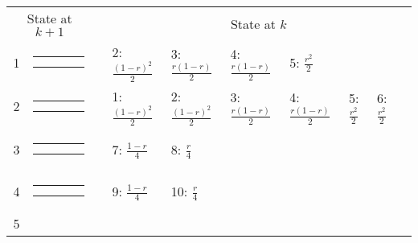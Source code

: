 \begin{center}
\begin{tabular}{ccclllllll} \hline
\multicolumn{2}{c}{State at $k+1$} & &
\multicolumn{7}{c}{State at $k$} \\
\cline{1-2} \cline{4-10}
1 &
{\renewcommand{\arraystretch}{0.3}
\renewcommand{\tabcolsep}{0.5mm}
\parbox[b][3mm][c]{12mm}{
\begin{tabular}{|p{2mm}|p{2mm}||p{2mm}|p{2mm}|} \hline
$\bullet$ & $\circ  $ &           &           \\
$\bullet$ & $\circ  $ &           &           \\ \hline
\end{tabular}}}
&
& 2: $\frac{(1-r)^2}{2}$
& 3: $\frac{r(1-r)}{2}$
& 4: $\frac{r(1-r)}{2}$
& 5: $\frac{r^2}{2}$
& & & \\
2 &
{\renewcommand{\arraystretch}{0.3}
\renewcommand{\tabcolsep}{0.5mm}
\parbox[b][3mm][c]{12mm}{
\begin{tabular}{|p{2mm}|p{2mm}||p{2mm}|p{2mm}|} \hline
$\bullet$ &           & $\circ  $ &           \\
$\bullet$ &           & $\circ  $ &           \\ \hline
\end{tabular}}}
&
& 1: $\frac{(1-r)^2}{2}$
& 2: $\frac{(1-r)^2}{2}$
& 3: $\frac{r(1-r)}{2}$
& 4: $\frac{r(1-r)}{2}$
& 5: $\frac{r^2}{2}$
& 6: $\frac{r^2}{2}$
& \\
3 &
{\renewcommand{\arraystretch}{0.3}
\renewcommand{\tabcolsep}{0.5mm}
\parbox[b][3mm][c]{12mm}{
\begin{tabular}{|p{2mm}|p{2mm}||p{2mm}|p{2mm}|} \hline
$\bullet$ &           & $\circ  $ &           \\
$\bullet$ &           &           & $\circ  $ \\ \hline
\end{tabular}}}
&
& 7: $\frac{1-r}{4}$
& 8: $\frac{r}{4}$
& & & & & \\
4 &
{\renewcommand{\arraystretch}{0.3}
\renewcommand{\tabcolsep}{0.5mm}
\parbox[b][3mm][c]{12mm}{
\begin{tabular}{|p{2mm}|p{2mm}||p{2mm}|p{2mm}|} \hline
$\bullet$ &           & $\circ  $ &           \\
          & $\bullet$ & $\circ  $ &           \\ \hline
\end{tabular}}}
&
& 9: $\frac{1-r}{4}$
& 10: $\frac{r}{4}$
& & & & & \\
5 &
{\renewcommand{\arraystretch}{0.3}
\renewcommand{\tabcolsep}{0.5mm}
}
\end{tabular}
\end{center}
